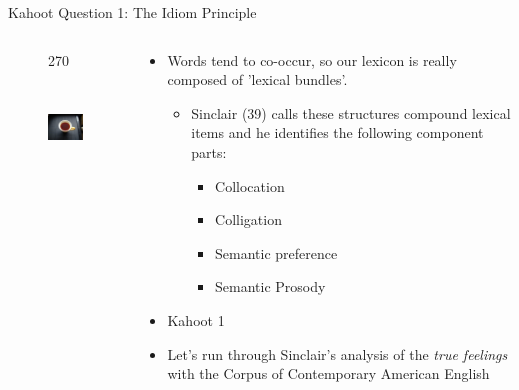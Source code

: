 \documentclass{beamer}
\begin{document}
\begin{frame}{Kahoot Question 1: The Idiom Principle}
    \begin{columns}
        \begin{column}{6cm}
            \begin{figure}
                \begin{turn}{270}
                \includegraphics[height=3cm, width=3cm]{Black-tea.jpg}
                \end{turn}
            \end{figure}
        \end{column}
        \begin{column}{6cm}
        \pause
        \begin{itemize}
            \item Words tend to co-occur, so our lexicon is really composed of 'lexical bundles'.
            \begin{itemize}
                \pause
                \item Sinclair (39) calls these structures compound lexical items and he identifies the following component parts:
                \begin{itemize}
                    \pause
                    \item Collocation
                    \pause
                    \item Colligation
                    \pause
                    \item Semantic preference
                    \pause
                    \item Semantic Prosody
                \end{itemize}
            \end{itemize}
        \pause
        \item Kahoot 1
        \pause
        \item Let's run through Sinclair's analysis of the \textit{true feelings} with the Corpus of Contemporary American English
        \end{itemize}
        \end{column}
    \end{columns}
\end{frame}
\end{document}
